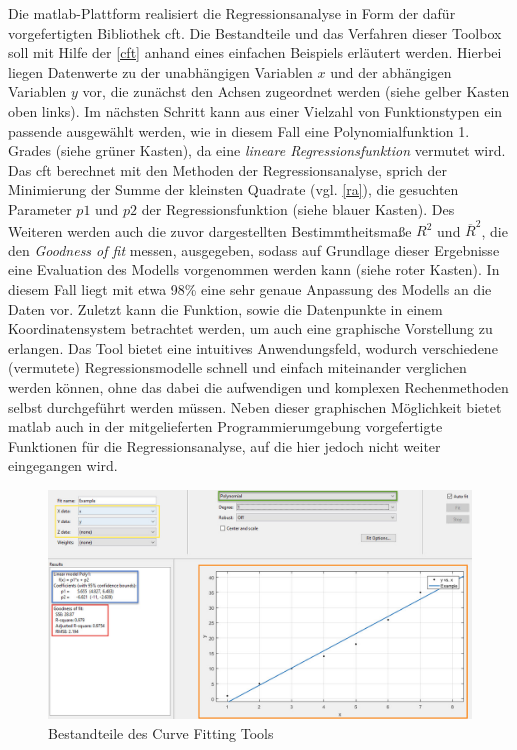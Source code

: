 Die \gls{matlab}-Plattform realisiert die Regressionsanalyse in Form der dafür vorgefertigten Bibliothek \gls{cft}. Die Bestandteile und das Verfahren dieser Toolbox soll mit Hilfe der \vref{cft} anhand eines einfachen Beispiels erläutert werden. Hierbei liegen Datenwerte zu der unabhängigen Variablen $x$ und der abhängigen Variablen $y$ vor, die zunächst den Achsen zugeordnet werden (siehe gelber Kasten oben links). Im nächsten Schritt kann aus einer Vielzahl von Funktionstypen ein passende ausgewählt werden, wie in diesem Fall eine Polynomialfunktion 1. Grades (siehe grüner Kasten), da eine \textit{lineare Regressionsfunktion} vermutet wird. Das \gls{cft} berechnet mit den Methoden der Regressionsanalyse, sprich der Minimierung der Summe der kleinsten Quadrate (vgl. \vref{ra}), die gesuchten Parameter $p1$ und $p2$ der Regressionsfunktion (siehe blauer Kasten). Des Weiteren werden auch die zuvor dargestellten Bestimmtheitsmaße $R^2$ und $\overline{R}^2$, die den \textit{Goodness of fit} messen, ausgegeben, sodass auf Grundlage dieser Ergebnisse eine Evaluation des Modells vorgenommen werden kann (siehe roter Kasten). In diesem Fall liegt mit etwa 98\% eine sehr genaue Anpassung des Modells an die Daten vor. Zuletzt kann die Funktion, sowie die Datenpunkte in einem Koordinatensystem betrachtet werden, um auch eine graphische Vorstellung zu erlangen. Das Tool bietet eine intuitives Anwendungsfeld, wodurch verschiedene (vermutete) Regressionsmodelle schnell und einfach miteinander verglichen werden können, ohne das dabei die aufwendigen und komplexen Rechenmethoden selbst durchgeführt werden müssen. Neben dieser graphischen Möglichkeit bietet \gls{matlab} auch in der mitgelieferten Programmierumgebung vorgefertigte Funktionen für die Regressionsanalyse, auf die hier jedoch nicht weiter eingegangen wird.

\begin{figure}
\centering
\includegraphics[scale=0.675]{se-wa-jpg/cft}
\caption[Bestandteile des Curve Fitting Tools]{Bestandteile des Curve Fitting Tools\protect\footnotemark}
\label{cft}
\end{figure}
